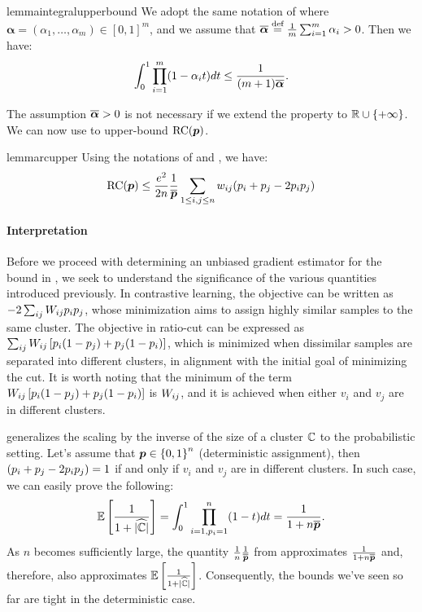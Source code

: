 \begin{restatable}{lemma}{integralupperbound}
	\label{lemma:integralupperbound}
	We adopt the same notation of  where
	$\bm{\alpha}=(\alpha_1,\ldots,\alpha_m)\in[0,1]^m$, and we assume that
	$\overline{\bm{\alpha}}\stackrel{\text{def}}{=}{\frac{1}{m}}\sum_{i=1}^m \alpha_i > 0$. Then we have:
	\[
		\int_0^1 \prod_{i=1}^{m}(1-\alpha_i t)dt \leq {\frac{1}{(m+1)\overline{\bm{\alpha}}}}.
	\]
\end{restatable}
The assumption $\overline{\bm{\alpha}} > 0$ is not necessary if we extend the
property to $\mathbb{R}\cup\left\lbrace+\infty\right\rbrace$. We can now use 
to upper-bound $\operatorname*{RC}({\bm{p}})$.

\begin{restatable}{lemma}{rcupper}\label{lemma:rcupper}
	Using the notations of  and
	, we have:
	\[
		\operatorname*{RC}({\bm{p}}) \leq \frac{e^2}{2n}{\frac{1}{\overline{{\bm{p}}}}} \sum_{1 \leq i,j\leq n}
		w_{ij}(p_i + p_j  -2 p_i p_j)
	\]
\end{restatable}
\paragraph{Interpretation}

Before we proceed with determining an unbiased gradient estimator for the bound in
, we seek to understand the significance of the various
quantities introduced previously. In contrastive learning, the objective can be
written as $-2\sum_{ij} {W}_{ij} {p}_i {p}_j$, whose minimization aims to assign
highly similar samples to the same cluster. The objective in ratio-cut can be
expressed as $\sum_{ij} {W}_{ij} \left[{p}_i(1-{p}_j) + {p}_j(1-{p}_i)\right]$, which
is minimized when dissimilar samples are separated into different clusters, in
alignment with the initial goal of minimizing the cut. It is worth noting that the
minimum of the term ${W}_{ij} \left[{p}_i(1-{p}_j) + {p}_j(1-{p}_i)\right]$ is
${W}_{ij}$, and it is achieved when either $v_i$ and $v_j$ are in different
clusters.

 generalizes the
scaling by the inverse of the size of a cluster ${\mathbb{C}}$ to the probabilistic setting.
Let's assume that ${\bm{p}} \in \left\lbrace0,1\right\rbrace^n$ (deterministic assignment), then
$({p}_i+{p}_j-2{p}_i{p}_j)=1$ if and only if $v_i$ and $v_j$ are in different
clusters. In such case, we can easily prove the following:
$$
	\mathbb{E}\left[{\frac{1}{1 + \widehat{|{\mathbb{C}}|}}}\right] = \int_{0}^{1} \prod_{i=1,{p}_i = 1}^{n} (1-t) dt = \frac{1}{1+n\overline{{\bm{p}}}}.
$$
As $n$ becomes sufficiently large, the quantity $\frac{1}{n}{\frac{1}{\overline{{\bm{p}}}}}$ from
 approximates $\frac{1}{1+n\overline{{\bm{p}}}}$ and, therefore, also
approximates $\mathbb{E}\left[{\frac{1}{1 + \widehat{|{\mathbb{C}}|}}}\right]$. Consequently, the bounds we've seen
so far are tight in the deterministic case.
